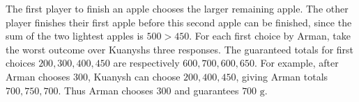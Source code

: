 The first player to finish an apple chooses the larger remaining apple. The other player finishes their first apple before this second apple can be finished, since the sum of the two lightest apples is $500>450$. For each first choice by Arman, take the worst outcome over Kuanysh\textquotesingle s three responses. The guaranteed totals for first choices $200,300,400,450$ are respectively $600,700,600,650$. For example, after Arman chooses $300$, Kuanysh can choose $200,400,450$, giving Arman totals $700,750,700$. Thus Arman chooses $300$ and guarantees $\boxed{700\text{ g}}$.
